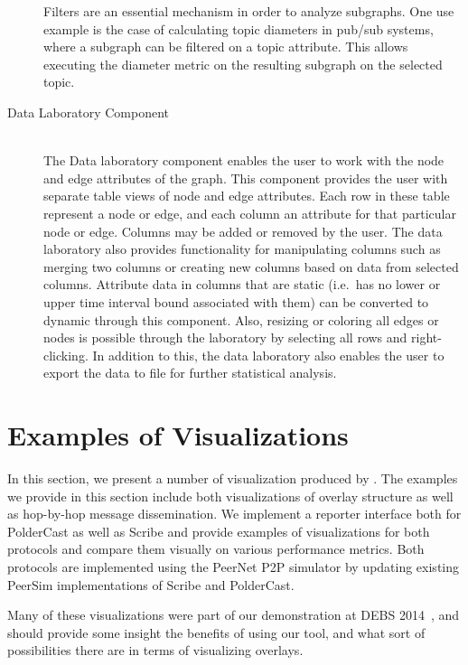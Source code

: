 \begin{description}
    Filters are an essential mechanism in order to analyze subgraphs.
    One use example is the case of calculating topic diameters in pub/sub systems,
    where a subgraph can be filtered on a topic attribute. This
    allows executing the diameter metric on the resulting subgraph
    on the selected topic.

\item[Data Laboratory Component] \hfill \\

    The Data laboratory component enables the user to work with the node
    and edge attributes of the graph. This component provides the user
    with separate table views of node and edge attributes. Each row in
    these table represent a node or edge, and each column an attribute
    for that particular node or edge. Columns may be added or removed by
    the user. The data laboratory also provides functionality for
    manipulating columns such as merging two columns or creating new
    columns based on data from selected columns. Attribute data in
    columns that are static (i.e.\ has no lower or upper time interval
    bound associated with them) can be converted to dynamic through this
    component. Also, resizing or coloring all edges or nodes is possible
    through the laboratory by selecting all rows and right-clicking. In
    addition to this, the data laboratory also enables the user to export the
    data to file for further statistical analysis.

\end{description}

\section{Examples of Visualizations}

In this section, we present a number of visualization produced by \demo.
The examples we provide in this section include both visualizations of
overlay structure as well as hop-by-hop message dissemination.  We
implement a reporter interface both for PolderCast as well as Scribe and
provide examples of visualizations for both protocols and compare them
visually on various performance metrics. Both protocols are implemented
using the PeerNet P2P simulator by updating existing PeerSim
implementations of Scribe and PolderCast.

Many of these visualizations were part of our demonstration at
DEBS 2014~\cite{}, and should provide some insight the benefits of using
our tool, and what sort of possibilities there are in terms of
visualizing overlays.

